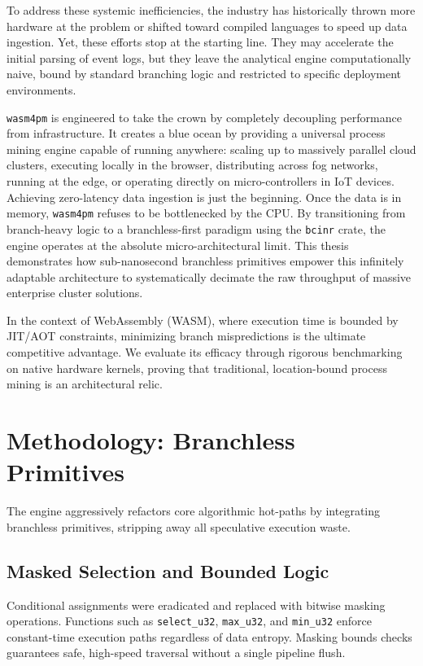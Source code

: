 \documentclass[12pt,a4paper]{report}
\begin{document}
To address these systemic inefficiencies, the industry has historically thrown more hardware at the problem or shifted toward compiled languages to speed up data ingestion. Yet, these efforts stop at the starting line. They may accelerate the initial parsing of event logs, but they leave the analytical engine computationally naive, bound by standard branching logic and restricted to specific deployment environments.

\texttt{wasm4pm} is engineered to take the crown by completely decoupling performance from infrastructure. It creates a blue ocean by providing a universal process mining engine capable of running anywhere: scaling up to massively parallel cloud clusters, executing locally in the browser, distributing across fog networks, running at the edge, or operating directly on micro-controllers in IoT devices. Achieving zero-latency data ingestion is just the beginning. Once the data is in memory, \texttt{wasm4pm} refuses to be bottlenecked by the CPU. By transitioning from branch-heavy logic to a branchless-first paradigm using the \texttt{bcinr} crate, the engine operates at the absolute micro-architectural limit. This thesis demonstrates how sub-nanosecond branchless primitives empower this infinitely adaptable architecture to systematically decimate the raw throughput of massive enterprise cluster solutions.

In the context of WebAssembly (WASM), where execution time is bounded by JIT/AOT constraints, minimizing branch mispredictions is the ultimate competitive advantage. We evaluate its efficacy through rigorous benchmarking on native hardware kernels, proving that traditional, location-bound process mining is an architectural relic.

\chapter{Methodology: Branchless Primitives}
The engine aggressively refactors core algorithmic hot-paths by integrating branchless primitives, stripping away all speculative execution waste.

\section{Masked Selection and Bounded Logic}
Conditional assignments were eradicated and replaced with bitwise masking operations. Functions such as \texttt{select\_u32}, \texttt{max\_u32}, and \texttt{min\_u32} enforce constant-time execution paths regardless of data entropy. Masking bounds checks guarantees safe, high-speed traversal without a single pipeline flush.
\end{document}
